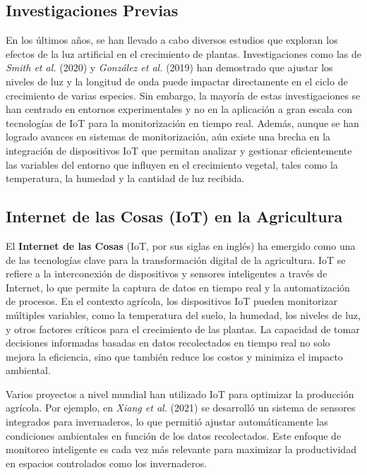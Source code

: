 \subsection{Investigaciones Previas}
En los últimos años, se han llevado a cabo diversos estudios que exploran los efectos de la luz artificial en el crecimiento de plantas. Investigaciones como las de \textit{Smith et al.} (2020) y \textit{González et al.} (2019) han demostrado que ajustar los niveles de luz y la longitud de onda puede impactar directamente en el ciclo de crecimiento de varias especies. Sin embargo, la mayoría de estas investigaciones se han centrado en entornos experimentales y no en la aplicación a gran escala con tecnologías de IoT para la monitorización en tiempo real. Además, aunque se han logrado avances en sistemas de monitorización, aún existe una brecha en la integración de dispositivos IoT que permitan analizar y gestionar eficientemente las variables del entorno que influyen en el crecimiento vegetal, tales como la temperatura, la humedad y la cantidad de luz recibida.

\subsection{Internet de las Cosas (IoT) en la Agricultura}
El \textbf{Internet de las Cosas} (IoT, por sus siglas en inglés) ha emergido como una de las tecnologías clave para la transformación digital de la agricultura. IoT se refiere a la interconexión de dispositivos y sensores inteligentes a través de Internet, lo que permite la captura de datos en tiempo real y la automatización de procesos. En el contexto agrícola, los dispositivos IoT pueden monitorizar múltiples variables, como la temperatura del suelo, la humedad, los niveles de luz, y otros factores críticos para el crecimiento de las plantas. La capacidad de tomar decisiones informadas basadas en datos recolectados en tiempo real no solo mejora la eficiencia, sino que también reduce los costos y minimiza el impacto ambiental.

Varios proyectos a nivel mundial han utilizado IoT para optimizar la producción agrícola. Por ejemplo, en \textit{Xiang et al.} (2021) se desarrolló un sistema de sensores integrados para invernaderos, lo que permitió ajustar automáticamente las condiciones ambientales en función de los datos recolectados. Este enfoque de monitoreo inteligente es cada vez más relevante para maximizar la productividad en espacios controlados como los invernaderos.

